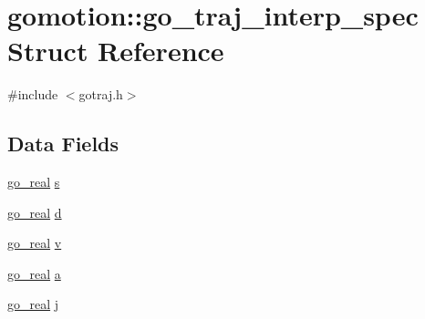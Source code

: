 \hypertarget{structgomotion_1_1go__traj__interp__spec}{\section{gomotion\-:\-:go\-\_\-traj\-\_\-interp\-\_\-spec Struct Reference}
\label{structgomotion_1_1go__traj__interp__spec}
}


{\ttfamily \#include $<$gotraj.\-h$>$}

\subsection*{Data Fields}
\begin{DoxyCompactItemize}
\item 
\hyperlink{gotypes_8h_afd666a2393eebd71ee455846ac9def9b}{go\-\_\-real} \hyperlink{structgomotion_1_1go__traj__interp__spec_a024cde18c75d6f3af02591e256addb04}{s}
\item 
\hyperlink{gotypes_8h_afd666a2393eebd71ee455846ac9def9b}{go\-\_\-real} \hyperlink{structgomotion_1_1go__traj__interp__spec_a6168eac0ded78cf4c9e75e0b3af3327b}{d}
\item 
\hyperlink{gotypes_8h_afd666a2393eebd71ee455846ac9def9b}{go\-\_\-real} \hyperlink{structgomotion_1_1go__traj__interp__spec_a839cd0bd8c7e4d2aef854d3b2aefd65d}{v}
\item 
\hyperlink{gotypes_8h_afd666a2393eebd71ee455846ac9def9b}{go\-\_\-real} \hyperlink{structgomotion_1_1go__traj__interp__spec_ad568653832d5b2ebf12f4a1892fa7f98}{a}
\item 
\hyperlink{gotypes_8h_afd666a2393eebd71ee455846ac9def9b}{go\-\_\-real} \hyperlink{structgomotion_1_1go__traj__interp__spec_af187e9cf7044548ed6bc6e1ba38f703e}{j}
\end{DoxyCompactItemize}



